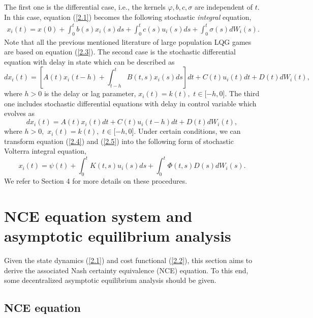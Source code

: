 \documentclass[11pt]{article}
\begin{document}
The first one is the differential case, i.e., the kernels $\varphi,b,c,\sigma $
are independent of $t.$ In this case, equation (\ref{2.1}) becomes the following
stochastic \emph{integral} equation,
\begin{eqnarray}\label{2.3}
x_{i}(t)=x(0)+\int_{0}^{t}b(s)x_{i}(s)ds+%
\int_{0}^{t}c(s)u_{i}(s)ds+\int_{0}^{t}\sigma(s)dW_i(s).
\end{eqnarray}
Note that all the previous mentioned literature of large population
LQG games are based on equation (\ref{2.3}). The second case is the
stochastic differential equation with delay in state which can be
described as
\begin{equation}\label{2.4}
dx_{i}(t)=\left[
A(t)x_{i}(t-h)+\int_{t-h}^{t}B(t,s)x_{i}(s)ds\right]
dt+C(t)u_i(t)dt+D(t)dW_i(t),
\end{equation}%
where $h>0$ is the delay or lag parameter, $x_{i}(t)=k(t),$ $t\in \lbrack -h,0].$ The third one
includes stochastic differential equations with delay in control
variable which evolves as
\begin{equation}\label{2.5}
dx_{i}(t)=A(t)x_{i}(t)dt+C(t)u_i(t-h)dt+D(t)dW_i(t),
\end{equation}%
where $h>0,$ $x_{i}(t)=k(t),$ $t\in \lbrack -h,0].$ Under certain
conditions, we can transform equation (\ref{2.4}) and (\ref{2.5})
into the following form of stochastic Volterra integral equation,
\[
x_{i}(t)=\psi(t)+\int_{0}^{t}K(t,s)u_i(s)ds+\int_{0}^{t}\Phi
(t,s)D(s)dW_i(s).
\]%
We refer to Section 4 for more details on these procedures.


\section{NCE equation system and asymptotic equilibrium analysis}

Given the state dynamics (\ref{2.1}) and cost functional
(\ref{2.2}), this section aims to derive the
associated Nash certainty equivalence (NCE) equation. To this end, some decentralized asymptotic equilibrium analysis should be given.


\subsection{NCE equation}
\end{document}
